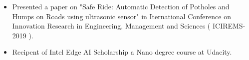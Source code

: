 \begin{itemize}
    \item Presented a paper on "Safe Ride: Automatic Detection of Potholes and Humps on Roads using ultrasonic sensor" in Iternational Conference on Innovation Research in Engineering, Management and Sciences ( ICIREMS-2019 ).
    \item Recipent of Intel Edge AI Scholarship a Nano degree course at Udacity.
\end{itemize}
